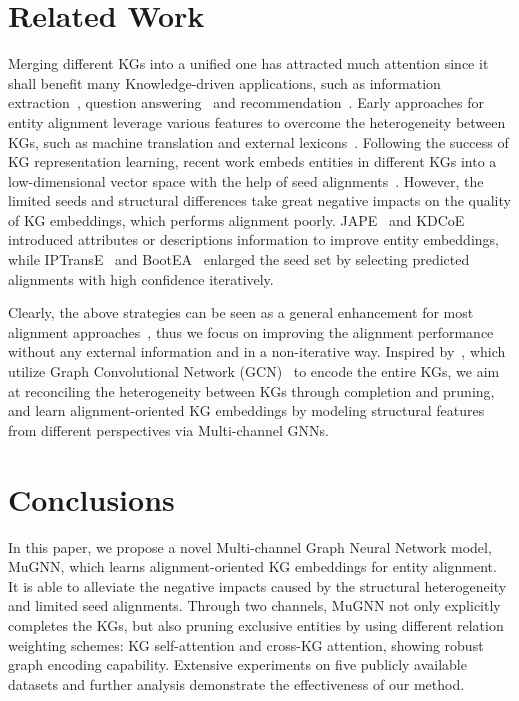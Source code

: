 \documentclass[11pt,a4paper]{article}
\begin{document}
\section{Related Work}




Merging different KGs into a unified one has attracted much attention since it shall benefit many Knowledge-driven applications, such as information extraction~\cite{cao2017bridge,cao2018joint}, question answering~\cite{zhang2015target} and recommendation~\cite{cao2019unifying}.
Early approaches for entity alignment leverage various features to overcome the heterogeneity between KGs, such as machine translation and external lexicons~\cite{suchanek2011paris,wang2013boosting}. Following the success of KG representation learning, recent work embeds entities in different KGs into a low-dimensional vector space with the help of seed alignments~\cite{chen2016multilingual}. However, the limited seeds and structural differences take great negative impacts on the quality of KG embeddings, which performs alignment poorly. JAPE~\cite{sun2017cross} and KDCoE~\cite{chen2018co} introduced attributes or descriptions information to improve entity embeddings, while IPTransE~\cite{zhu2017iterative} and BootEA~\cite{sun2018bootstrapping} enlarged the seed set by selecting predicted alignments with high confidence iteratively.

Clearly, the above strategies can be seen as a general enhancement for most alignment approaches~\cite{sun2018bootstrapping}, thus we focus on improving the alignment performance without any external information and in a non-iterative way. Inspired by~\citet{wang2018cross}, which utilize Graph Convolutional Network (GCN)~\cite{kipf2016semi} to encode the entire KGs, we aim at reconciling the heterogeneity between KGs through completion and pruning, and learn alignment-oriented KG embeddings by modeling structural features from different perspectives via Multi-channel GNNs.

\section{Conclusions}

In this paper, we propose a novel Multi-channel Graph Neural Network model, MuGNN, which learns alignment-oriented KG embeddings for entity alignment. It is able to alleviate the negative impacts caused by the structural heterogeneity and limited seed alignments. Through two channels, MuGNN not only explicitly completes the KGs, but also pruning exclusive entities by using different relation weighting schemes: KG self-attention and cross-KG attention, showing robust graph encoding capability.
Extensive experiments on five publicly available datasets and further analysis demonstrate the effectiveness of our method.
\end{document}
